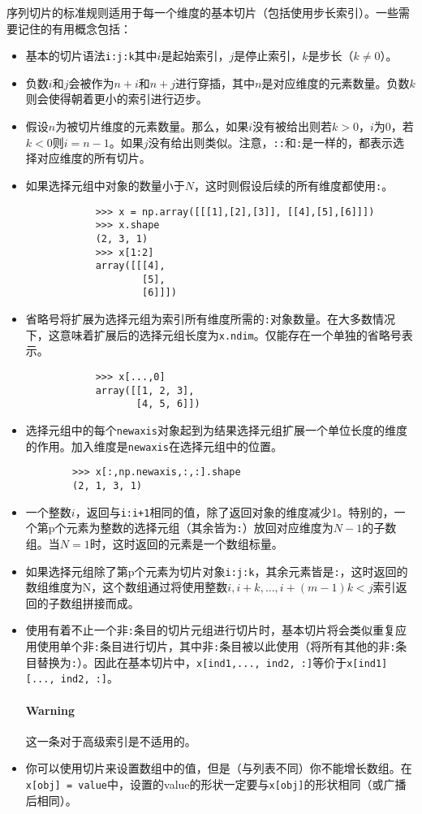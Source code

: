 \documentclass[../main]{subfile}
\begin{document}
序列切片的标准规则适用于每一个维度的基本切片（包括使用步长索引）。一些需要记住的有用概念包括：
\begin{itemize}
    \item 基本的切片语法\lstinline{i:j:k}其中$i$是起始索引，$j$是停止索引，$k$是步长（$k \neq 0$）。
    \item 负数$i$和$j$会被作为$n + i$和$n + j$进行穿插，其中$n$是对应维度的元素数量。负数$k$则会使得朝着更小的索引进行迈步。
    \item 假设$n$为被切片维度的元素数量。那么，如果$i$没有被给出则若$k > 0$，$i$为0，若$k < 0$则$i = n - 1$。如果$j$没有给出则类似。注意，\lstinline{::}和\lstinline{:}是一样的，都表示选择对应维度的所有切片。
    \item 如果选择元组中对象的数量小于$N$，这时则假设后续的所有维度都使用\lstinline{:}。
          \begin{lstlisting}
            >>> x = np.array([[[1],[2],[3]], [[4],[5],[6]]])
            >>> x.shape
            (2, 3, 1)
            >>> x[1:2]
            array([[[4],
                    [5],
                    [6]]])
        \end{lstlisting}
    \item 省略号将扩展为选择元组为索引所有维度所需的\lstinline{:}对象数量。在大多数情况下，这意味着扩展后的选择元组长度为\lstinline{x.ndim}。仅能存在一个单独的省略号表示。
          \begin{lstlisting}
            >>> x[...,0]
            array([[1, 2, 3],
                   [4, 5, 6]])
        \end{lstlisting}
    \item 选择元组中的每个\lstinline{newaxis}对象起到为结果选择元组扩展一个单位长度的维度的作用。加入维度是\lstinline{newaxis}在选择元组中的位置。
          \begin{lstlisting}
        >>> x[:,np.newaxis,:,:].shape
        (2, 1, 3, 1)
    \end{lstlisting}
    \item 一个整数$i$，返回与\lstinline{i:i+1}相同的值，除了返回对象的维度减少1。特别的，一个第p个元素为整数的选择元组（其余皆为\lstinline{:}）放回对应维度为$N - 1$的子数组。当$N=1$时，这时返回的元素是一个数组标量。
    \item 如果选择元组除了第p个元素为切片对象\lstinline{i:j:k}，其余元素皆是\lstinline{:}，这时返回的数组维度为N，这个数组通过将使用整数$i, i+k, \ldots, i + (m - 1)k < j$索引返回的子数组拼接而成。
    \item 使用有着不止一个非\lstinline{:}条目的切片元组进行切片时，基本切片将会类似重复应用使用单个非\lstinline{:}条目进行切片，其中非\lstinline{:}条目被以此使用（将所有其他的非\lstinline{:}条目替换为\lstinline{:}）。因此在基本切片中，\lstinline{x[ind1,..., ind2, :]}等价于\lstinline{x[ind1][..., ind2, :]}。
          \paragraph{Warning} 这一条对于高级索引是不适用的。
    \item 你可以使用切片来设置数组中的值，但是（与列表不同）你不能增长数组。在\lstinline{x[obj] = value}中，设置的value的形状一定要与\lstinline{x[obj]}的形状相同（或广播后相同）。
\end{itemize}
\end{document}
